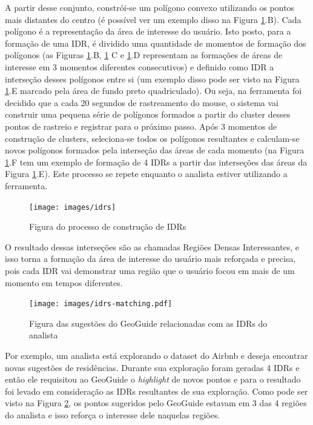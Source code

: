 A partir desse conjunto, constrói-se um polígono convexo utilizando os pontos mais distantes do centro (é possível ver um exemplo disso na Figura \ref{fig:idrs-geoguide}.B). Cada polígono é a representação da área de interesse do usuário. Isto posto, para a formação de uma IDR, é dividido uma quantidade de momentos de formação dos polígonos (as Figuras \ref{fig:idrs-geoguide}.B, \ref{fig:idrs-geoguide} C e \ref{fig:idrs-geoguide}.D representam as formações de áreas de interesse em 3 momentos diferentes consecutivos) e definido como IDR a interseção desses polígonos entre si (um exemplo disso pode ser visto na Figura \ref{fig:idrs-geoguide}.E marcado pela área de fundo preto quadriculado). Ou seja, na ferramenta foi decidido que a cada 20 segundos de rastreamento do mouse, o sistema vai construir uma pequena série de polígonos formados a partir do cluster desses pontos de rastreio e registrar para o próximo passo. Após 3 momentos de construção de clusters, seleciona-se todos os polígonos resultantes e calculam-se novos polígonos formados pela interseção das áreas de cada momento (na Figura \ref{fig:idrs-geoguide}.F tem um exemplo de formação de 4 IDRs a partir das interseções das áreas da Figura \ref{fig:idrs-geoguide}.E). Este processo se repete enquanto o analista estiver utilizando a ferramenta.

\begin{figure}[t]
	\centering
	\texttt{[image: images/idrs]}
	\caption{Figura do processo de construção de IDRs}
	\label{fig:idrs-geoguide}
	\vspace{-10pt}
\end{figure}

O resultado dessas interseções são as chamadas Regiões Densas Interessantes, e isso torna a formação da área de interesse do usuário mais reforçada e precisa, pois cada IDR vai demonstrar uma região que o usuário focou em mais de um momento em tempos diferentes.

\begin{figure}[t]
	\centering
	\texttt{[image: images/idrs-matching.pdf]}
	\caption{Figura das sugestões do GeoGuide relacionadas com as IDRs do analista}
	\label{fig:idrs}
	\vspace{-10pt}
\end{figure}

Por exemplo, um analista está explorando o dataset do Airbnb e deseja encontrar novas sugestões de residências. Durante sua exploração foram geradas 4 IDRs e então ele requisitou ao GeoGuide o \textit{highlight} de novos pontos e para o resultado foi levado em consideração as IDRs resultantes de sua exploração. Como pode ser visto na Figura \ref{fig:idrs}, os pontos sugeridos pelo GeoGuide estavam em 3 das 4 regiões do analista e isso reforça o interesse dele naquelas regiões.

